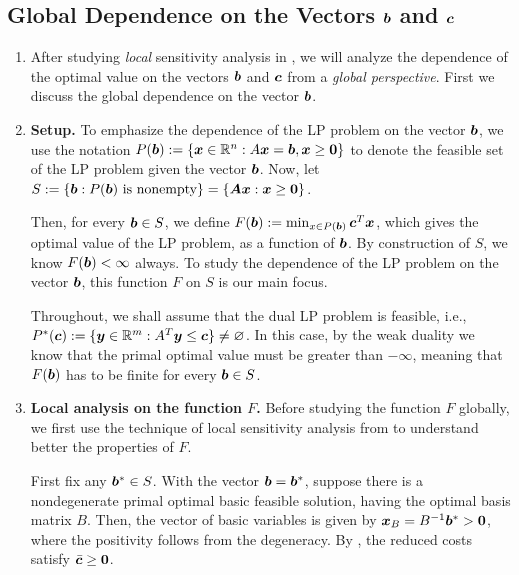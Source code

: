 \subsection{Global Dependence on the Vectors \texorpdfstring{\(\bm{b}\) and \(\bm{c}\)}{b and c}}
\label{subsect:global-dep-bc}
\begin{enumerate}
\item After studying \emph{local} sensitivity analysis in
, we will analyze the dependence of the
optimal value on the vectors \(\bm{b}\) and \(\bm{c}\) from a \emph{global
perspective}.  First we discuss the global dependence on the vector \(\bm{b}\).
\item \textbf{Setup.} To emphasize the dependence of the LP problem on the
vector \(\bm{b}\), we use the notation
\(P(\bm{b}):=\{\bm{x}\in\mathbb{R}^n:A\bm{x}=\bm{b},\bm{x}\ge\bm{0}\}\) to
denote the feasible set of the LP problem given the vector \(\bm{b}\).
Now, let \(S:=\{\bm{b}:P(\bm{b})\text{ is nonempty}\}=\{\bm{A}\bm{x}:\bm{x}\ge\bm{0}\}\).

Then, for every \(\bm{b}\in S\), we define \(F(\bm{b}):=\min_{x\in
P(\bm{b})}\bm{c}^{T}\bm{x}\), which gives the optimal value of the LP
problem, as a function of \(\bm{b}\). By construction of \(S\), we know
\(F(\bm{b})<\infty\) always. To study the dependence of the LP problem on the
vector \(\bm{b}\), this function \(F\) on \(S\) is our main focus.

Throughout, we shall assume that the dual LP problem is feasible, i.e.,
\(P^{*}(\bm{c}):=\{\bm{y}\in\mathbb{R}^m:A^{T}\bm{y}\le \bm{c}\}\ne\varnothing\). In this case,
by the weak duality we know that the primal optimal value must be greater than
\(-\infty\), meaning that \(F(\bm{b})\) has to be finite for every
\(\bm{b}\in S\).
\item \textbf{Local analysis on the function \(F\).} Before studying the
function \(F\) globally, we first use the technique of local sensitivity
analysis from  to understand better the
properties of \(F\).

First fix any \(\bm{b}^{*}\in S\). With the vector \(\bm{b}=\bm{b}^{*}\),
suppose there is a nondegenerate primal optimal basic feasible solution, having
the optimal basis matrix \(B\). Then, the vector of basic variables is given by
\(\bm{x}_{B}=B^{-1}\bm{b}^{*}>\bm{0}\), where the positivity follows from
the degeneracy. By , the reduced costs
satisfy \(\bar{\bm{c}}\ge\bm{0}\).


\end{enumerate}
